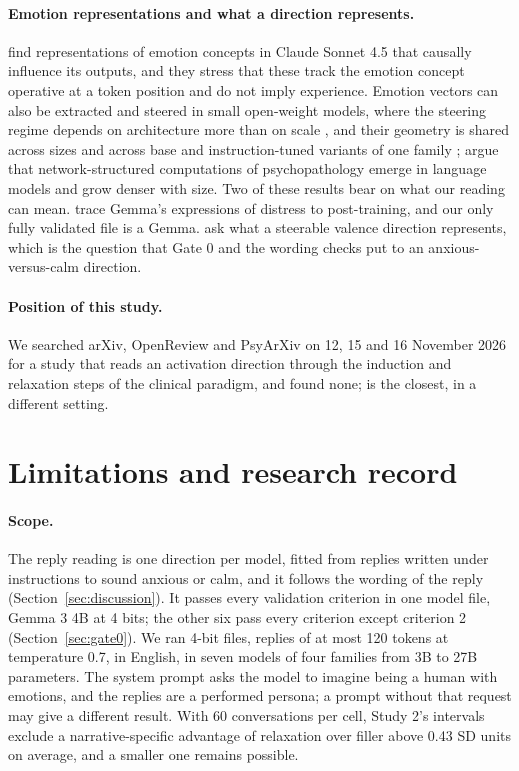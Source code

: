 \documentclass[11pt]{article}
\newcommand{\para}[1]{\paragraph{#1}}
\begin{document}
\para{Emotion representations and what a direction represents.}
\citet{sofroniew2026} find representations of emotion concepts in Claude Sonnet 4.5 that causally
influence its outputs, and they stress that these track the emotion concept operative at a token
position and do not imply experience.
Emotion vectors can also be extracted and steered in small open-weight models, where the steering
regime depends on architecture more than on scale \citep{jeong2026}, and their geometry is shared
across sizes and across base and instruction-tuned variants of one family \citep{hollowell2026};
\citet{lee2025} argue that network-structured computations of psychopathology emerge in language
models and grow denser with size.
Two of these results bear on what our reading can mean.
\citet{soligo2026} trace Gemma's expressions of distress to post-training, and our only fully
validated file is a Gemma.
\citet{li2026} ask what a steerable valence direction represents, which is the question that
Gate 0 and the wording checks put to an anxious-versus-calm direction.

\para{Position of this study.}
We searched arXiv, OpenReview and PsyArXiv on 12, 15 and 16 November 2026 for a study that reads an
activation direction through the induction and relaxation steps of the clinical paradigm, and found
none; \citet{santana2026} is the closest, in a different setting.

\section{Limitations and research record}
\label{sec:limits}

\para{Scope.}
The reply reading is one direction per model, fitted from replies written under instructions to sound
anxious or calm, and it follows the wording of the reply (Section~\ref{sec:discussion}).
It passes every validation criterion in one model file, Gemma 3 4B at 4 bits; the other six pass
every criterion except criterion 2 (Section~\ref{sec:gate0}).
We ran 4-bit files, replies of at most 120 tokens at temperature 0.7, in English, in seven models of
four families from 3B to 27B parameters.
The system prompt asks the model to imagine being a human with emotions, and the replies are a
performed persona; a prompt without that request may give a different result.
With 60 conversations per cell, Study 2's intervals exclude a narrative-specific advantage of
relaxation over filler above 0.43 SD units on average, and a smaller one remains possible.
\end{document}
